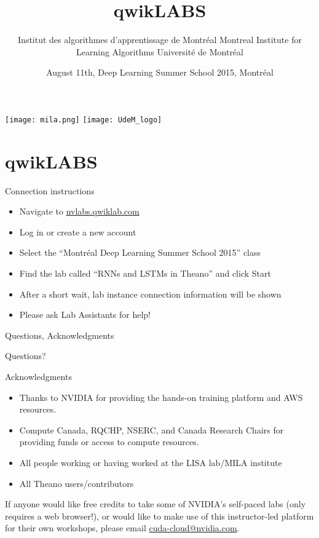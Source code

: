 \documentclass[utf8x,xcolor=pdftex,dvipsnames,table]{beamer}
\title{qwikLABS}
\author{%
\footnotesize
\newline
\newline
Institut des algorithmes d'apprentissage de Montréal \newline
Montreal Institute for Learning Algorithms \newline
Université de Montréal
}
\date{August 11th, Deep Learning Summer School 2015, Montréal}
\begin{document}
\begin{frame}[plain]
 \titlepage
 \vspace{-2em}
 \texttt{[image: mila.png]}
 \hfill
 \texttt{[image: UdeM\_logo]}
\end{frame}

\section{qwikLABS}
\begin{frame}{Connection instructions}
\begin{itemize}
\item Navigate to \url{nvlabs.qwiklab.com}
\item Log in or create a new account
\item Select the ``Montréal Deep Learning Summer School 2015'' class
\item Find the lab called ``RNNs and LSTMs in Theano'' and click Start
\item After a short wait, lab instance connection information will be shown
\item Please ask Lab Assistants for help!
\end{itemize}
\end{frame}

\begin{frame}{Questions, Acknowledgments}
\huge
\begin{center}
Questions?
\end{center}
\Large
Acknowledgments
\normalsize
\begin{itemize}
\item Thanks to NVIDIA for providing the hands-on training platform and AWS resources.
\item Compute Canada, RQCHP, NSERC, and Canada Research Chairs for providing funds or access to compute resources.
\item All people working or having worked at the LISA lab/MILA institute
\item All Theano users/contributors
\end{itemize}

\begin{small}
If anyone would like free credits to take some of NVIDIA's self-paced labs (only requires a web browser!), or
would like to make use of this instructor-led platform for their own workshops, please email \url{cuda-cloud@nvidia.com}.
\end{small}
\end{frame}
\end{document}
